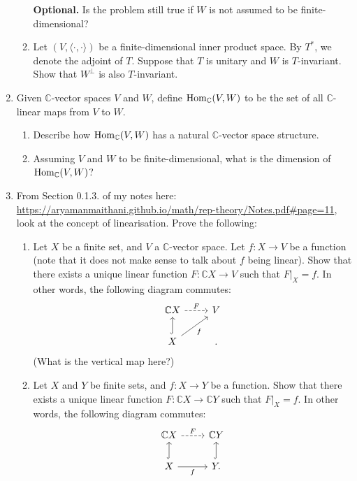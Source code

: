 \documentclass[12pt]{article}
\begin{document}
\begin{enumerate}
\begin{enumerate}
		\textbf{Optional.} Is the problem still true if $W$ is not assumed to be finite-dimensional?
		\item Let $(V, \langle \cdot, \cdot\rangle)$ be a finite-dimensional inner product space. By $T^{\ast}$, we denote the adjoint of $T$. Suppose that $T$ is unitary and $W$ is $T$-invariant. Show that $W^{\perp}$ is also $T$-invariant.
	\end{enumerate}
	\item Given $\mathbb{C}$-vector spaces $V$ and $W$, define $\operatorname{Hom}_{\mathbb{C}}(V, W)$ to be the set of all $\mathbb{C}$-linear maps from $V$ to $W$.
	\begin{enumerate}
		\item Describe how $\operatorname{Hom}_{\mathbb{C}}(V, W)$ has a natural $\mathbb{C}$-vector space structure.
		\item Assuming $V$ and $W$ to be finite-dimensional, what is the dimension of $\operatorname{Hom}_{\mathbb{C}}(V, W)$?
	\end{enumerate}
	\item From Section 0.1.3. of my notes here: \url{https://aryamanmaithani.github.io/math/rep-theory/Notes.pdf#page=11}, look at the concept of linearisation. Prove the following:
	\begin{enumerate}
		\item Let $X$ be a finite set, and $V$ a $\mathbb{C}$-vector space. Let $f : X \to V$ be a function (note that it does not make sense to talk about $f$ being linear). Show that there exists a unique linear function $F : \mathbb{C}X \to V$ such that $F|_{X} = f$. In other words, the following diagram commutes:
		\begin{equation*} 
			\begin{tikzcd}
				\mathbb{C}X \arrow[r, "F", dashed] & V \\
				X \arrow[u, hook] \arrow[ru, "f"'] & .
			\end{tikzcd}
		\end{equation*}
		(What is the vertical map here?)
		\item Let $X$ and $Y$ be finite sets, and $f : X \to Y$ be a function. Show that there exists a unique linear function $F : \mathbb{C}X \to \mathbb{C}Y$ such that $F|_{X} = f$. In other words, the following diagram commutes:
		\begin{equation*} 
			\begin{tikzcd}
				\mathbb{C}X \arrow[r, "F", dashed] & \mathbb{C}Y \\
				X \arrow[u, hook] \arrow[r, "f"'] & Y \arrow[u, hook].

\end{tikzcd}
\end{equation*}
\end{enumerate}
\end{enumerate}
\end{document}
